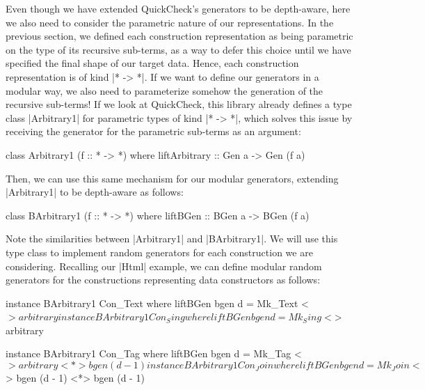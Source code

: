 Even though we have extended QuickCheck's generators to be depth-aware, here we
also need to consider the parametric nature of our representations.
%
In the previous section, we defined each construction representation as being
parametric on the type of its recursive sub-terms, as a way to defer this choice
until we have specified the final shape of our target data.
%
Hence, each construction representation is of kind |* -> *|.
%
If we want to define our generators in a modular way, we also need to
parameterize somehow the generation of the recursive sub-terms!
%
If we look at QuickCheck, this library already defines a type class |Arbitrary1|
for parametric types of kind |* -> *|, which solves this issue by receiving the
generator for the parametric sub-terms as an argument:

\begin{code}
class Arbitrary1 (f :: * -> *) where
  liftArbitrary :: Gen a -> Gen (f a)
\end{code}
%
%
%
%
Then, we can use this same mechanism for our modular generators, extending
|Arbitrary1| to be depth-aware as follows:

\begin{code}
class BArbitrary1 (f :: * -> *) where
  liftBGen :: BGen a -> BGen (f a)
\end{code}
%
Note the similarities between |Arbitrary1| and |BArbitrary1|.
%
We will use this type class to implement random generators for each construction
we are considering.
%
Recalling our |Html| example, we can define modular random generators for the
constructions representing data constructors as follows:

\begin{code}
instance BArbitrary1 Con_Text where
  liftBGen bgen d = Mk_Text <$> arbitrary

instance BArbitrary1 Con_Sing where
  liftBGen bgen d = Mk_Sing <$> arbitrary

instance BArbitrary1 Con_Tag where
  liftBGen bgen d = Mk_Tag <$> arbitrary <*> bgen (d - 1)

instance BArbitrary1 Con_Join where
  liftBGen bgen d = Mk_Join <$> bgen (d - 1) <*> bgen (d - 1)
\end{code} %

